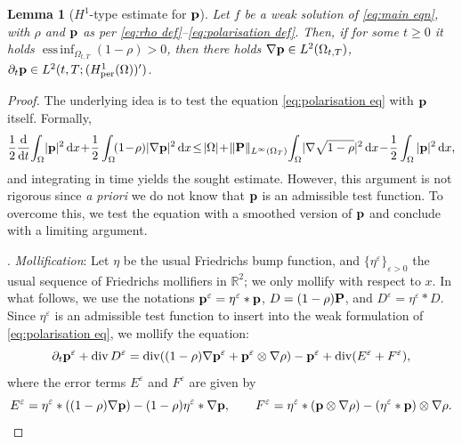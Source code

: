 \documentclass[11pt,a4paper,reqno]{amsart}
\newtheorem{lemma}[prop]{Lemma}
\theoremstyle{remark}
\theoremstyle{definition}
\numberwithin{equation}{section}
\newcommand{\per}{\mathrm{per}}
\DeclareMathOperator{\dv}{div}
\DeclareMathOperator{\essinf}{ess \, inf}
\renewcommand{\P}{{\bf P}}
\newcommand{\p}{{\bf p}}
\renewcommand{\d}{\, \mathrm{d} }
\newcommand{\der}{\mathrm{d}}
\begin{document}
\begin{lemma}[$H^1$-type estimate for $\p$]\label{lem:H1 p}
  Let $f$ be a weak solution of \eqref{eq:main eqn}, with $\rho$ and $\p$ as per \eqref{eq:rho def}--\eqref{eq:polarisation def}. Then,  if for some $t\geq 0$ it holds $\essinf_{\Omega_{t,T}}(1-\rho)>0$, then there holds  $\nabla \p \in L^2(\Omega_{t,T})$, $\partial_t \p \in L^2(t,T;(H^1_\per(\Omega))')$. 
\end{lemma}
\begin{proof}
    The underlying idea is to test the equation \eqref{eq:polarisation eq} with $\p$ itself. Formally, 
    \begin{equation*}
    \begin{aligned}
         \frac{1}{2}\frac{\der}{\der t}\!\int_\Omega\! |\p|^2 \d x \!+\! \frac{1}{2}\int_\Omega\! (1\!-\!\rho) |\nabla \p|^2 \d x \!\leq\! |\Omega| \!+\! \Vert \P \Vert_{L^\infty(\Omega_T)} \! \int_\Omega\! |\nabla \sqrt{1-\rho}|^2 \d x \!-\! \frac{1}{2}\int_\Omega |\p|^2 \d x, 
    \end{aligned}
\end{equation*}
and integrating in time yields the sought estimate. However, this argument is not rigorous since \emph{a priori} we do not know that $\p$ is an admissible test function. To overcome this, we test the equation with a smoothed version of $\p$ and conclude with a limiting argument. 

    \smallskip 

    . \textit{Mollification}: Let $\eta$ be the usual Friedrichs bump function, and $\{\eta^\varepsilon\}_{\varepsilon>0}$ the usual sequence of Friedrichs mollifiers in $\mathbb{R}^2$; we only mollify with respect to $x$. In what follows, we use the notations $\p^\varepsilon = \eta^\varepsilon*\p$, $D = (1-\rho)\P$, and $D^\varepsilon = \eta^\varepsilon*D$. Since $\eta^\varepsilon$ is an admissible test function to insert into the weak formulation of \eqref{eq:polarisation eq}, we mollify the equation: 
    \begin{equation}\label{eq:mollified p eqn}
        \partial_t \p^\varepsilon + \dv D^\varepsilon = \dv((1-\rho)\nabla\p^\varepsilon + \p^\varepsilon \otimes \nabla \rho) - \p^\varepsilon + \dv (E^\varepsilon + F^\varepsilon), 
    \end{equation}
    where the error terms $E^\varepsilon$ and $F^\varepsilon$ are given by 
    \begin{equation}\label{eq:error terms mollified p eqn}
        E^\varepsilon = \eta^\varepsilon*((1-\rho)\nabla \p) - (1-\rho)\eta^\varepsilon*\nabla \p , \qquad F^\varepsilon = \eta^\varepsilon*(\p \otimes \nabla \rho) - (\eta^\varepsilon*\p )\otimes \nabla \rho. 
    \end{equation}


\end{proof}
\end{document}
